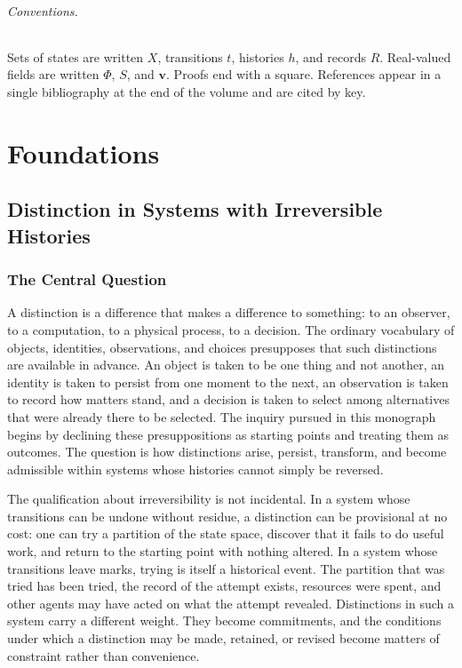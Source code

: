 \documentclass[11pt,twoside,openright]{book}
\theoremstyle{plain}
\theoremstyle{definition}
\theoremstyle{remark}
\begin{document}
\paragraph{Conventions.}
Sets of states are written $X$, transitions $t$, histories $h$, and records $R$. Real-valued fields are written $\Phi$, $S$, and $\mathbf{v}$. Proofs end with a square. References appear in a single bibliography at the end of the volume and are cited by key.

\tableofcontents

\mainmatter
\part{Foundations}

\chapter{Distinction in Systems with Irreversible Histories}
\label{ch:intro}

\section{The Central Question}

A distinction is a difference that makes a difference to something: to an observer, to a computation, to a physical process, to a decision. The ordinary vocabulary of objects, identities, observations, and choices presupposes that such distinctions are available in advance. An object is taken to be one thing and not another, an identity is taken to persist from one moment to the next, an observation is taken to record how matters stand, and a decision is taken to select among alternatives that were already there to be selected. The inquiry pursued in this monograph begins by declining these presuppositions as starting points and treating them as outcomes. The question is how distinctions arise, persist, transform, and become admissible within systems whose histories cannot simply be reversed.

The qualification about irreversibility is not incidental. In a system whose transitions can be undone without residue, a distinction can be provisional at no cost: one can try a partition of the state space, discover that it fails to do useful work, and return to the starting point with nothing altered. In a system whose transitions leave marks, trying is itself a historical event. The partition that was tried has been tried, the record of the attempt exists, resources were spent, and other agents may have acted on what the attempt revealed. Distinctions in such a system carry a different weight. They become commitments, and the conditions under which a distinction may be made, retained, or revised become matters of constraint rather than convenience.
\end{document}
